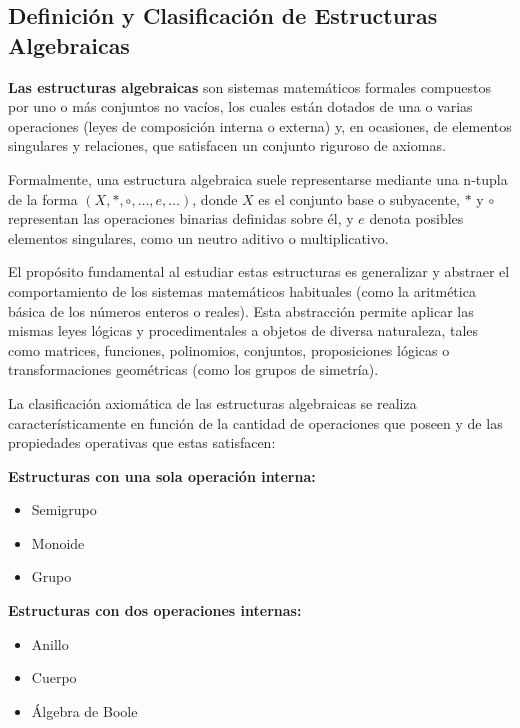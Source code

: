\documentclass{article}
\begin{document}
\subsection{Definición y Clasificación de Estructuras Algebraicas} 
\label{sec:definicion_clasificacion_estructuras_algebraicas}

\textbf{Las estructuras algebraicas} son sistemas matemáticos formales compuestos por uno o más conjuntos no vacíos, los cuales están dotados de una o varias operaciones (leyes de composición interna o externa) y, en ocasiones, de elementos singulares y relaciones, que satisfacen un conjunto riguroso de axiomas.

Formalmente, una estructura algebraica suele representarse mediante una n-tupla de la forma $(X, *, \circ, \dots, e, \dots)$, donde $X$ es el conjunto base o subyacente, $*$ y $\circ$ representan las operaciones binarias definidas sobre él, y $e$ denota posibles elementos singulares, como un neutro aditivo o multiplicativo.

El propósito fundamental al estudiar estas estructuras es generalizar y abstraer el comportamiento de los sistemas matemáticos habituales (como la aritmética básica de los números enteros o reales). Esta abstracción permite aplicar las mismas leyes lógicas y procedimentales a objetos de diversa naturaleza, tales como matrices, funciones, polinomios, conjuntos, proposiciones lógicas o transformaciones geométricas (como los grupos de simetría).

La clasificación axiomática de las estructuras algebraicas se realiza característicamente en función de la cantidad de operaciones que poseen y de las propiedades operativas que estas satisfacen:
 \bigskip

\textbf{Estructuras con una sola operación interna:}

\begin{itemize}
    \item Semigrupo
    \item Monoide
    \item Grupo
\end{itemize}

\textbf{Estructuras con dos operaciones internas:}

\begin{itemize}
    \item Anillo
    \item Cuerpo
    \item Álgebra de Boole
\end{itemize}
\end{document}
